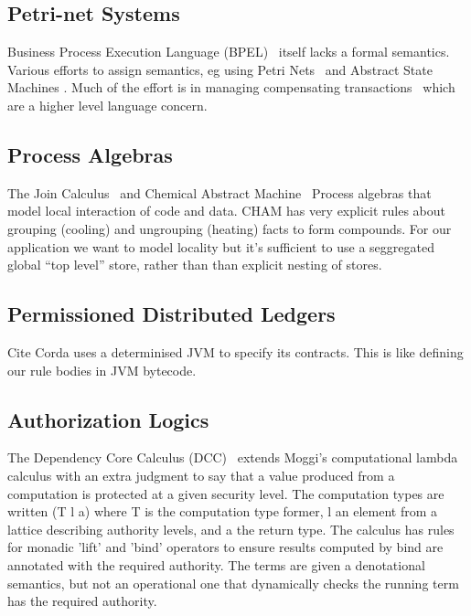 \subsection{Petri-net Systems}


Business Process Execution Language (BPEL)~\cite{Andrews2003:BPEL} itself lacks a formal semantics. Various efforts to assign semantics, eg using Petri Nets~\cite{Lohmann2009:PetriBPEL} and Abstract State Machines \cite{Fahland2005:SemanticsBPEL}. Much of the effort is in managing compensating transactions~\cite{Colombo2011:Compensating} which are a higher level language concern.


\subsection{Process Algebras}
The Join Calculus~\cite{Cedric1996:Reflexive} and Chemical Abstract Machine~\cite{Berry1992:Chemical} Process algebras that model local interaction of code and data. CHAM has very explicit rules about grouping (cooling) and ungrouping (heating) facts to form compounds. For our application we want to model locality but it's sufficient to use a seggregated global ``top level'' store, rather than than explicit nesting of stores.


\subsection{Permissioned Distributed Ledgers}
Cite Corda uses a determinised JVM to specify its contracts. This is like defining our rule bodies in JVM bytecode.

\subsection{Authorization Logics}

The Dependency Core Calculus (DCC)~\cite{Abadi1999:DCC} extends Moggi's computational lambda calculus with an extra judgment to say that a value produced from a computation is protected at a given security level. The computation types are written (T l a) where T is the computation type former, l an element from a lattice describing authority levels, and a the return type. The calculus has rules for monadic 'lift' and 'bind' operators to ensure results computed by bind are annotated with the required authority. The terms are given a denotational semantics, but not an operational one that dynamically checks the running term has the required authority.

